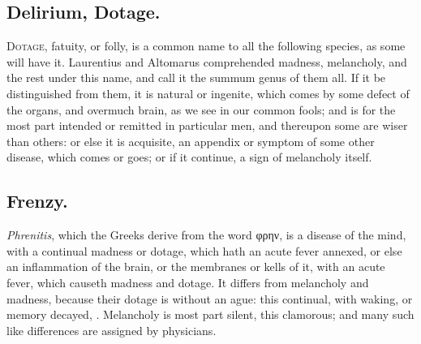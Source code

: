{\subsection{Delirium, Dotage.}
\lettrine{D}{otage}, fatuity, or folly, is a common name to all
the following species, as some will have it. Laurentius and 
Altomarus comprehended madness, melancholy, and the rest under this
name, and call it the summum genus of them all. If it be distinguished
from them, it is natural or ingenite, which comes by some defect of the
organs, and overmuch brain, as we see in our common fools; and is for
the most part intended or remitted in particular men, and thereupon
some are wiser than others: or else it is acquisite, an appendix or
symptom of some other disease, which comes or goes; or if it continue,
a sign of melancholy itself.

\subsection{Frenzy.}
\emph{Phrenitis}, which the Greeks derive from the word \textgreek{φρην}, is
a disease of the mind, with a continual madness or dotage, which hath
an acute fever annexed, or else an inflammation of the brain, or the
membranes or kells of it, with an acute fever, which causeth madness
and dotage. It differs from melancholy and madness, because their
dotage is without an ague: this continual, with waking, or memory
decayed, \etc{}. Melancholy is most part silent, this clamorous; and many
such like differences are assigned by physicians.

}
